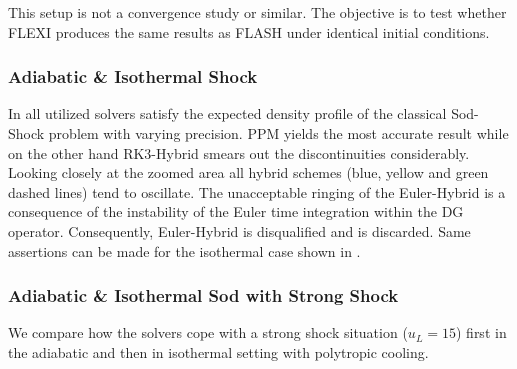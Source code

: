 This setup is not a convergence study or similar. The objective is to test
whether FLEXI produces the same results as FLASH under identical initial
conditions.


\subsubsection{Adiabatic \& Isothermal Shock}
In  all utilized solvers satisfy the
expected density profile of the classical Sod-Shock problem with varying
precision. PPM yields the most accurate result while on the other hand
RK3-Hybrid smears out the discontinuities considerably. Looking closely at the
zoomed area all hybrid schemes (blue, yellow and green dashed lines) tend to
oscillate.  The unacceptable ringing of the Euler-Hybrid is a consequence of
the instability of the Euler time integration within the DG operator.
Consequently, Euler-Hybrid is disqualified and is discarded.  Same assertions
can be made for the isothermal case shown in
.

\subsubsection{Adiabatic \& Isothermal Sod with Strong Shock}
We compare how the solvers cope with a strong shock situation ($u_L = 15$)
first in the adiabatic and then in isothermal setting with polytropic cooling.

